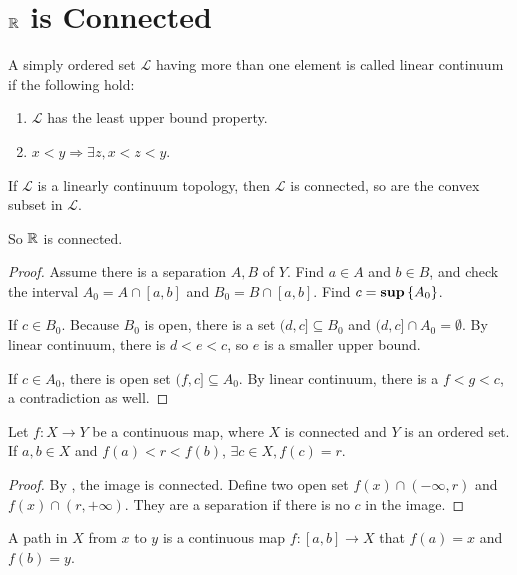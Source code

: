 \section{$\mathbb{R}$ is Connected}

\begin{definition}
    A simply ordered set $\mathcal{L}$ having more than one element is called linear continuum if the following hold:
    \begin{enumerate}
        \item $\mathcal{L}$ has the least upper bound property.
        \item $x < y \Rightarrow \exists z, x < z < y$.
    \end{enumerate}
\end{definition}

\begin{theorem}
    If $\mathcal{L}$ is a linearly continuum topology, then $\mathcal{L}$ is connected, so are the convex subset in $\mathcal{L}$. 
    
    So $\mathbb{R}$ is connected.
\end{theorem}
\begin{proof}
    Assume there is a separation $A,B$ of $Y$. Find $a \in A$ and $b \in B$, and check the interval $A_0 = A \cap [a,b]$ and $B_0 = B \cap [a,b]$. Find $c = \mathbf{sup} \set{A_0}$. 
    
    If $c \in B_0$. Because $B_0$ is open, there is a set $(d,c] \subseteq B_0$ and $(d,c] \cap A_0 = \emptyset$. By linear continuum, there is $d < e < c$, so $e$ is a smaller upper bound.
    
    If $c \in A_0$, there is open set $(f,c] \subseteq A_0$. By linear continuum, there is a $f < g < c$, a contradiction as well.
\end{proof}


\begin{theorem}
    Let $f : X \rightarrow Y$ be a continuous map, where $X$ is connected and $Y$ is an ordered set. If $a,b \in X$ and $f(a) < r < f(b)$, $\exists c \in X, f(c) = r$.
\end{theorem}
\begin{proof}
    By , the image is connected. Define two open set $f(x) \cap (-\infty, r)$ and $f(x) \cap (r, +\infty)$. They are a separation if there is no $c$ in the image.
\end{proof}

\begin{definition}
    A path in $X$ from $x$ to $y$ is a continuous map $f: [a,b] \rightarrow X$ that $f(a) = x$ and $f(b) = y$. 
\end{definition}

